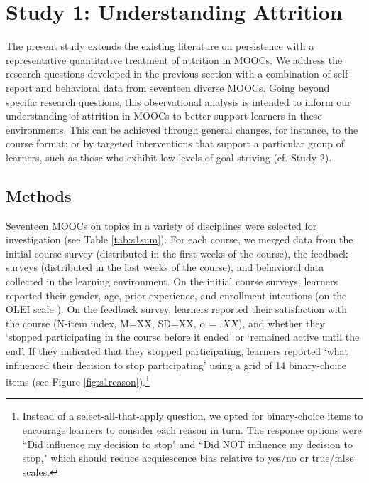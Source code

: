 \documentclass{sigchi}\usepackage[]{graphicx}\usepackage[]{color}
\begin{document}
\section{Study 1: Understanding Attrition}

The present study extends the existing literature on persistence with a representative quantitative treatment of attrition in MOOCs. We address the research questions developed in the previous section with a combination of self-report and behavioral data from seventeen diverse MOOCs. Going beyond specific research questions, this observational analysis is intended to inform our understanding of attrition in MOOCs to better support learners in these environments. This can be achieved through general changes, for instance, to the course format; or by targeted interventions that support a particular group of learners, such as those who exhibit low levels of goal striving (cf. Study 2).

\subsection{Methods}

Seventeen MOOCs on topics in a variety of disciplines were selected for investigation (see Table \ref{tab:s1sum}). For each course, we merged data from the initial course survey (distributed in the first weeks of the course), the feedback surveys (distributed in the last weeks of the course), and behavioral data collected in the learning environment. 
On the initial course surveys, learners reported their gender, age, prior experience, and enrollment intentions (on the OLEI scale \cite{kizilcec2015motivation}). On the feedback survey, learners reported their satisfaction with the course (N-item index, M=XX, SD=XX, $\alpha=.XX$), and whether they `stopped participating in the course before it ended' or `remained active until the end'. If they indicated that they stopped participating, learners reported `what influenced their decision to stop participating' using a grid of 14 binary-choice items (see Figure \ref{fig:s1reason}).\footnote{Instead of a select-all-that-apply question, we opted for binary-choice items to encourage learners to consider each reason in turn. The response options were ``Did influence my decision to stop" and ``Did NOT influence my decision to stop," which should reduce acquiescence bias relative to yes/no or true/false scales.}
\end{document}
